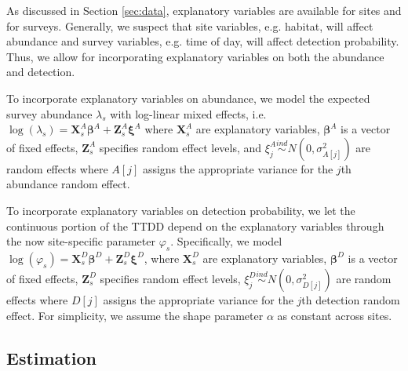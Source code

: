 \documentclass[12pt]{article}
\newcommand{\vX}{\textbf{X}}
\newcommand{\vZ}{\textbf{Z}}
\newcommand{\vbeta}{\boldsymbol{\beta}}
\newcommand{\vxi}{\boldsymbol{\xi}}
\newcommand{\ind}{\stackrel{ind}{\sim}}
\begin{document}
As discussed in Section \ref{sec:data}, explanatory variables are available for sites and for surveys. 
Generally, we suspect that site variables, e.g. habitat, will affect abundance and survey variables, e.g. time of day, will affect detection probability. 
Thus, we allow for incorporating explanatory variables on both the abundance and detection.

To incorporate explanatory variables on abundance, we model the expected survey abundance $\lambda_{s}$ with log-linear mixed effects, i.e. $\log (\lambda_{s}) = \vX_{s}^A\vbeta^A + \vZ_{s}^A\vxi^A$ where $\vX_{s}^A$ are explanatory variables, $\vbeta^A$ is a vector of fixed effects, $\vZ_{s}^A$ specifies random effect levels, and $\xi_j^A \ind N(0,\sigma_{A[j]}^2)$ are random effects where $A[j]$ assigns the appropriate variance for the $j$th abundance random effect.  

To incorporate explanatory variables on detection probability, we let the continuous portion of the TTDD depend on the explanatory variables through the now site-specific parameter $\varphi_s$. 
Specifically, we model $\log(\varphi_{s}) = \vX_{s}^D\vbeta^D + \vZ_{s}^D\vxi^D$, where $\vX_{s}^D$ are explanatory variables, $\vbeta^D$ is a vector of fixed effects, $\vZ_{s}^D$ specifies random effect levels, $\xi_j^D \ind N(0,\sigma_{D[j]}^2)$ are random effects where $D[j]$ assigns the appropriate variance for the $j$th detection random effect.  
For simplicity, we assume the shape parameter $\alpha$ as constant across sites.



\subsection{Estimation}
\end{document}
